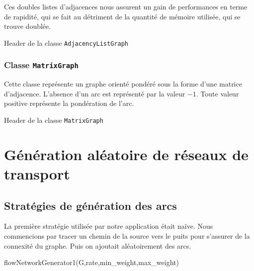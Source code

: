 Ces doubles listes d'adjacences nous assurent un gain de performances en terme de rapidité, qui se fait au détriment de la quantité de mémoire utilisée, qui se trouve doublée.

Header de la classe \texttt{AdjacencyListGraph}




\subsubsection{Classe \texttt{MatrixGraph}}

Cette classe représente un graphe orienté pondéré sous la forme d'une matrice d'adjacence. L'absence d'un arc est représenté par la valeur $-1$. Toute valeur positive représente la pondération de l'arc.

Header de la classe \texttt{MatrixGraph}




\section{Génération aléatoire de réseaux de transport}

\subsection{Stratégies de génération des arcs}

La première stratégie utilisée par notre application était naïve. Nous commencions par tracer un chemin de la source vers le puits pour s'assurer de la connexité du graphe. Puis on ajoutait aléatoirement des arcs.

\begin{algorithm}[H]
  \caption{flowNetworkGenerator1(G,rate,min\_weight,max\_weight)}
\end{algorithm}

